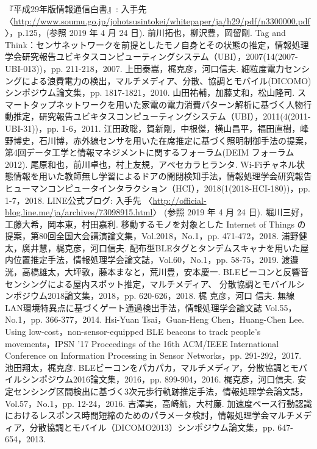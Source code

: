 \documentclass[Japanese]{dicomopapers}
\begin{document}
\begin{thebibliography}{20}
    『平成29年版情報通信白書』: 入手先 〈\url{http://www.soumu.go.jp/johotsusintokei/whitepaper/ja/h29/pdf/n3300000.pdf}〉，p.125，(参照 2019 年 4 月 24 日).
    前川拓也，柳沢豊，岡留剛. Tag and Think：センサネットワークを前提としたモノ自身とその状態の推定，情報処理学会研究報告ユビキタスコンピューティングシステム（UBI），2007(14(2007-UBI-013))，pp. 211-218，2007.
    上田泰嵩，梶克彦，河口信夫. 細粒度電力センシングによる浪費電力の検出，マルチメディア、分散、協調とモバイル(DICOMO)シンポジウム論文集，pp. 1817-1821，2010.
    山田祐輔，加藤丈和，松山隆司. スマートタップネットワークを用いた家電の電力消費パターン解析に基づく人物行動推定，研究報告ユビキタスコンピューティングシステム（UBI），2011(4(2011-UBI-31))，pp. 1-6，2011.
    江田政聡，賀新剛，中根傑，横山昌平，福田直樹，峰野博史，石川博，赤外線センサを用いた在席推定に基づく照明制御手法の提案，第4回データ工学と情報マネジメントに関するフォーラム(DEIM フォーラム 2012).
    尾原和也，前川卓也，村上友規，アベセカラヒランタ. Wi-Fiチャネル状態情報を用いた教師無し学習によるドアの開閉検知手法，情報処理学会研究報告ヒューマンコンピュータインタラクション（HCI），2018(1(2018-HCI-180))，pp. 1-7，2018.
    LINE公式ブログ: 入手先 〈\url{http://official-blog.line.me/ja/archives/73098915.html}〉 (参照 2019 年 4 月 24 日).
    堀川三好，工藤大希，岡本東，村田嘉利. 移動するモノを対象とした Internet of Things の提案，第80回全国大会講演論文集，Vol.2018，No.1，pp. 471-472，2018.
    浦野健太，廣井慧，梶克彦，河口信夫. 配布型BLEタグとタンデムスキャナを用いた屋内位置推定手法，情報処理学会論文誌，Vol.60，No.1，pp. 58-75，2019.
    渡邉洸，高橋雄太，大坪敦，藤本まなと，荒川豊，安本慶一. BLEビーコンと反響音センシングによる屋内スポット推定，マルチメディア、 分散協調とモバイルシンポジウム2018論文集，2018，pp. 620-626，2018.
    梶 克彦，河口 信夫. 無線LAN環境特異点に基づくゲート通過検出手法，情報処理学会論文誌 Vol.55，No.1，pp. 366-377，2014.
    Hsi-Yuan Tsai，Guan-Heng Chen，Huang-Chen Lee. Using low-cost，non-sensor-equipped BLE beacons to track people's movements，IPSN '17 Proceedings of the 16th ACM/IEEE International Conference on Information Processing in Sensor Networks，pp. 291-292，2017.
    池田翔太，梶克彦. BLEビーコンをパカパカ，マルチメディア，分散協調とモバイルシンポジウム2016論文集，2016，pp. 899-904，2016.
    梶克彦，河口信夫. 安定センシング区間検出に基づく3次元歩行軌跡推定手法，情報処理学会論文誌，Vol.57，No.1，pp. 12-24，2016.
    吉澤実，高崎航，大村廉. 加速度ベース行動認識におけるレスポンス時間短縮のためのパラメータ検討，情報処理学会マルチメディア，分散協調とモバイル（DICOMO2013）シンポジウム論文集，pp. 647-654，2013.
\end{thebibliography}
\end{document}
